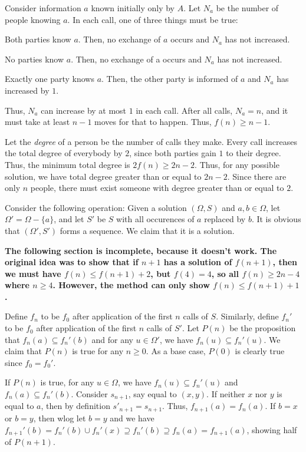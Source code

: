 \documentclass[11pt]{article}
\begin{document}
Consider information $a$ known initially only by $A$.
Let $N_a$ be the number of people knowing $a$.
In each call, one of three things must be true:
\begin{compactitem}
\item Both parties know $a$. 
    Then, no exchange of $a$ occurs and $N_a$ has not increased.
\item No parties know $a$. 
    Then, no exchange of a occurs and $N_a$ has not increased.
\item Exactly one party knows $a$.
    Then, the other party is informed of $a$ and $N_a$ has increased by $1$.
\end{compactitem}
Thus, $N_a$ can increase by at most $1$ in each call. 
After all calls, $N_a = n$, and it must take at least $n-1$ moves
for that to happen. Thus, $f(n) \ge n - 1$.

Let the \emph{degree} of a person be the number of calls they make.
Every call increases the total degree of everybody by $2$,
since both parties gain $1$ to their degree.
Thus, the minimum total degree is $2f(n) \ge 2n - 2$.
Thus, for any possible solution,
we have total degree greater than or equal to $2n - 2$.
Since there are only $n$ people, there must exist
someone with degree greater than or equal to $2$.

Consider the following operation: 
Given a solution $(\Omega, S)$ and $a,b \in \Omega$,
let $\Omega' = \Omega - \{a\}$, and
let $S'$ be $S$ with all occurences of $a$ replaced by $b$.
It is obvious that $(\Omega', S')$ forms a sequence.
We claim that it is a solution.

\textbf{The following section is incomplete,
because it doesn't work.
The original idea was to show that if $n+1$ has
a solution of $f(n+1)$, then we must have $f(n) \le f(n+1) + 2$,
but $f(4) = 4$, so all $f(n) \ge 2n - 4$ where $n \ge 4$.
However, the method can only show $f(n) \le f(n+1) + 1$.
}

Define $f_n$ to be $f_{0}$ after application
of the first $n$ calls of $S$.
Similarly, define $f_n'$ to be $f_{0}$ after application
of the first $n$ calls of $S'$.
Let $P(n)$ be the proposition that 
$f_n(a) \subseteq f_n'(b)$ and
for any $u \in \Omega'$,
we have $f_n(u) \subseteq f_n'(u)$.
We claim that $P(n)$ is true for any $n \ge 0$.
As a base case, $P(0)$ is clearly true since $f_{0}=f_{0}'$.

If $P(n)$ is true, for any $u \in \Omega$, we have $f_n(u) \subseteq f_n'(u)$ and $f_n(a) \subseteq f_n'(b)$.
Consider $s _{n+1}$, say equal to $(x,y)$.
If neither $x$ nor $y$ is equal to $a$,
then by definition $s'_{n+1} = s_{n+1}$.
Thus, $f_{n+1}(a) = f_n(a)$.
If $b=x$ or $b=y$, then wlog let $b=y$ and we have
$f_{n+1}'(b) = f_{n}'(b) \cup f_n'(x) \supseteq f_n'(b) \supseteq f_n(a) = f_{n+1}(a)$, 
showing half of $P(n+1)$.
\end{document}
